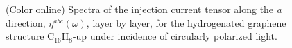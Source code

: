 \documentclass[pss]{wiley2sp} %
\begin{document}
\begin{figure}[b]
  \centering
  \\
  \\
  \caption{(Color online) Spectra of the injection current tensor along the \emph{a} direction, {$\eta^{abc}(\omega)$}, layer by layer, for the hydrogenated graphene structure C$_{16}$H$_{8}$-up under incidence of circularly polarized light.\label{fig:up-eta}}
\end{figure}
\end{document}
